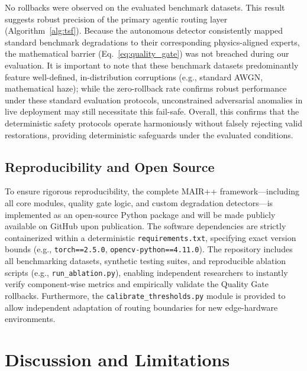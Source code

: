 \documentclass[journal, 10pt]{IEEEtran}
\begin{document}
No rollbacks were observed on the evaluated benchmark datasets. This result suggests robust precision of the primary agentic routing layer (Algorithm~\ref{alg:tsf}). Because the autonomous detector consistently mapped standard benchmark degradations to their corresponding physics-aligned experts, the mathematical barrier (Eq.~\ref{eq:quality_gate}) was not breached during our evaluation. It is important to note that these benchmark datasets predominantly feature well-defined, in-distribution corruptions (e.g., standard AWGN, mathematical haze); while the zero-rollback rate confirms robust performance under these standard evaluation protocols, unconstrained adversarial anomalies in live deployment may still necessitate this fail-safe. Overall, this confirms that the deterministic safety protocols operate harmoniously without falsely rejecting valid restorations, providing deterministic safeguards under the evaluated conditions.

\subsection{Reproducibility and Open Source}
To ensure rigorous reproducibility, the complete MAIR++ framework—including all core modules, quality gate logic, and custom degradation detectors—is implemented as an open-source Python package and will be made publicly available on GitHub upon publication. The software dependencies are strictly containerized within a deterministic \texttt{requirements.txt}, specifying exact version bounds (e.g., \texttt{torch==2.5.0}, \texttt{opencv-python==4.11.0}). The repository includes all benchmarking datasets, synthetic testing suites, and reproducible ablation scripts (e.g., \texttt{run\_ablation.py}), enabling independent researchers to instantly verify component-wise metrics and empirically validate the Quality Gate rollbacks. Furthermore, the \texttt{calibrate\_thresholds.py} module is provided to allow independent adaptation of routing boundaries for new edge-hardware environments.


\section{Discussion and Limitations}
\end{document}
